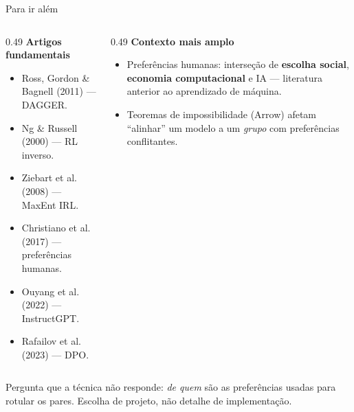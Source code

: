 \documentclass[aspectratio=169, 11pt]{beamer}
\begin{document}
\begin{frame}{Para ir além}

  \begin{columns}[T]
  \begin{column}{0.49\textwidth}
    \textbf{Artigos fundamentais}
    \begin{itemize}\setlength{\itemsep}{0ex}
      \item Ross, Gordon \& Bagnell (2011) --- DAGGER.
      \item Ng \& Russell (2000) --- RL inverso.
      \item Ziebart et al. (2008) --- MaxEnt IRL.
      \item Christiano et al. (2017) --- preferências humanas.
      \item Ouyang et al. (2022) --- InstructGPT.
      \item Rafailov et al. (2023) --- DPO.
    \end{itemize}
  \end{column}
  \begin{column}{0.49\textwidth}
    \textbf{Contexto mais amplo}
    \begin{itemize}\setlength{\itemsep}{0ex}
      \item Preferências humanas: interseção de \textbf{escolha social},
        \textbf{economia computacional} e IA --- literatura anterior ao
        aprendizado de máquina.
      \item Teoremas de impossibilidade (Arrow) afetam ``alinhar'' um modelo a
        um \emph{grupo} com preferências conflitantes.
    \end{itemize}
  \end{column}
  \end{columns}

  \begin{alertabox}
    Pergunta que a técnica não responde: \emph{de quem} são as preferências
    usadas para rotular os pares. Escolha de projeto, não detalhe de
    implementação.
  \end{alertabox}
\end{frame}
\end{document}
